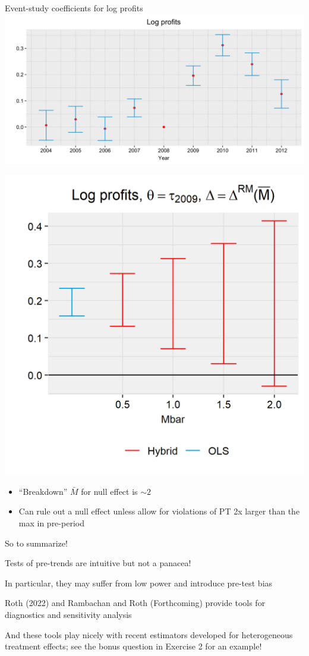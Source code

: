 \documentclass[aspectratio = 169, 13pt]{beamer}
\begin{document}
\begin{frame}{Event-study coefficients for log profits}
	\centering
	\includegraphics[width = 0.8 \textwidth]{figures/Benzarti-Carloni/profits-event-study.png}
\end{frame}

\begin{frame}
	{\centering
		\includegraphics[width = 0.4\linewidth]{figures/Benzarti-Carloni/sensitivity-MB-profits.png}
	}
	
	\begin{itemize}
		\item
		      ``Breakdown'' $\bar{M}$ for null effect is $\sim 2$
		          
		\item
		      Can rule out a null effect unless allow for violations of PT 2x larger than the max in pre-period
		      
	\end{itemize}
	
\end{frame}


\begin{frame}{So to summarize!}
	\begin{wideitemize}
		\item
		Tests of pre-trends are intuitive but not a panacea!
		    
		\item
		In particular, they may suffer from low power and introduce pre-test bias
		    
		\item
		Roth (2022) and Rambachan and Roth (Forthcoming) provide tools for diagnostics and sensitivity analysis
		    
		\item
		And these tools play nicely with recent estimators developed for heterogeneous treatment effects; see the bonus question in Exercise 2 for an example!
		    
	\end{wideitemize}
\end{frame}
\end{document}
